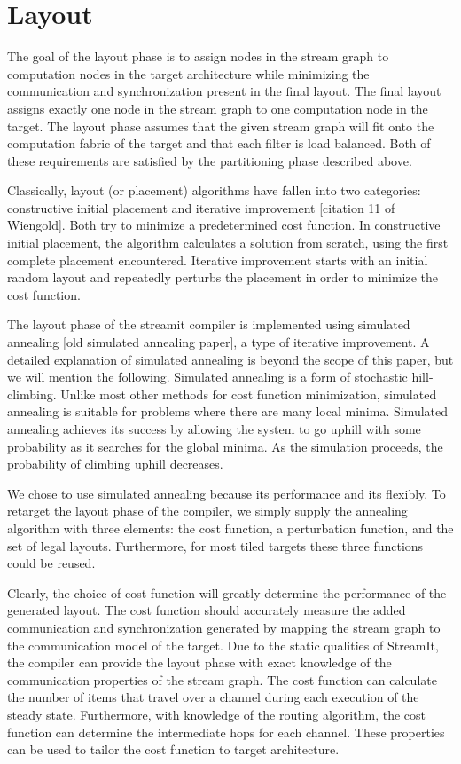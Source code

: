\section{Layout}

The goal of the layout phase is to assign nodes in the stream graph to
computation nodes in the target architecture while minimizing the
communication and synchronization present in the final layout.  The
final layout assigns exactly one node in the stream graph to one
computation node in the target.  The layout phase assumes that the
given stream graph will fit onto the computation fabric of the target
and that each filter is load balanced.  Both of these requirements are
satisfied by the partitioning phase described above.

Classically, layout (or placement) algorithms have fallen into two
categories: constructive initial placement and iterative improvement
[citation 11 of Wiengold].  Both try to minimize a predetermined cost
function.  In constructive initial placement, the algorithm calculates
a solution from scratch, using the first complete placement
encountered.  Iterative improvement starts with an initial random
layout and repeatedly perturbs the placement in order to minimize the
cost function.

The layout phase of the streamit compiler is implemented using
simulated annealing [old simulated annealing paper], a type of
iterative improvement.  A detailed explanation of simulated annealing
is beyond the scope of this paper, but we will mention the following.
Simulated annealing is a form of stochastic hill-climbing. Unlike most
other methods for cost function minimization, simulated annealing is
suitable for problems where there are many local minima.  Simulated
annealing achieves its success by allowing the system to go uphill
with some probability as it searches for the global minima.  As the
simulation proceeds, the probability of climbing uphill decreases.
  
We chose to use simulated annealing because its performance and its
flexibly.  To retarget the layout phase of the compiler, we simply
supply the annealing algorithm with three elements: the cost function,
a perturbation function, and the set of legal layouts.  Furthermore,
for most tiled targets these three functions could be reused.

Clearly, the choice of cost function will greatly determine the
performance of the generated layout.  The cost function should
accurately measure the added communication and synchronization
generated by mapping the stream graph to the communication model of
the target.  Due to the static qualities of StreamIt, the compiler can
provide the layout phase with exact knowledge of the communication
properties of the stream graph.  The cost function can calculate the
number of items that travel over a channel during each execution of
the steady state.  Furthermore, with knowledge of the routing
algorithm, the cost function can determine the intermediate hops for
each channel.  These properties can be used to tailor the cost
function to target architecture.

